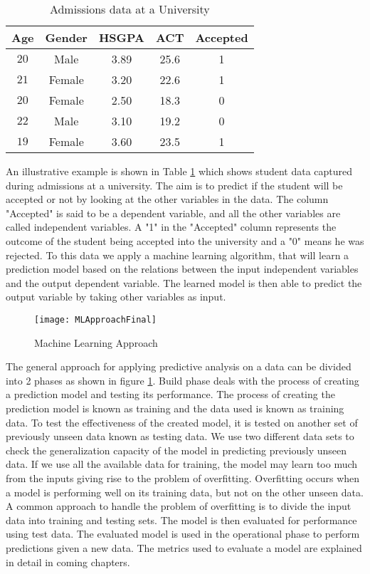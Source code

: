 \documentclass[11pt,openright]{report}
\begin{document}
 \begin{table}[!t]
	\renewcommand{\arraystretch}{1.3}
	\caption{Admissions data at a University}
	\label{table:example_db}
	\centering
	\begin{tabular}{|c|c|c|c|c|}
		\hline
		\bfseries Age & \bfseries Gender & \bfseries HSGPA & \bfseries ACT & \bfseries Accepted\\
		\hline
		$20$ & Male & 3.89 & 25.6 & 1\\ \hline
		$21$ & Female & 3.20 & 22.6 & 1\\ \hline
		$20$ & Female & 2.50 & 18.3 & 0\\ \hline
		$22$ & Male & 3.10 &  19.2 & 0\\ \hline
		$19$ & Female & 3.60 & 23.5 & 1\\ \hline
	\end{tabular}
\end{table}



An illustrative example is shown in Table \ref{table:example_db} which shows student data captured during admissions at a university. The aim is to predict if the student will be accepted or not by looking at the other variables in the data. The column "Accepted" is said to be a dependent variable, and all the other variables are called independent variables. A "1" in the "Accepted" column represents the outcome of the student being accepted into the university and a "0" means he was rejected. To this data we apply a machine learning algorithm, that will learn a prediction model based on the relations between the input independent variables and the output dependent variable. The learned model is then able to predict the output variable by taking other variables as input.
  \begin{figure}
	\centering
	\texttt{[image: MLApproachFinal]}
	\caption{Machine Learning Approach}
	\label{fig:predictive_analysis-approach}
\end{figure}
 

The general approach for applying predictive analysis on a data can be divided into 2 phases as shown in figure \ref{fig:predictive_analysis-approach}. Build phase deals with the process of creating a prediction model and testing its performance. The process of creating the prediction model is known as training and the data used is known as training data. To test the effectiveness of the created model, it is tested on another set of previously unseen data known as testing data. We use two different data sets to check the generalization capacity of the model in predicting previously unseen data. If we use all the available data for training, the model may learn too much from the inputs giving rise to the problem of overfitting. Overfitting occurs when a model is performing well on its training data, but not on the other unseen data. A common approach to handle the problem of overfitting is to divide the input data into training and testing sets. The model is then evaluated for performance using test data.  The evaluated model is used in the operational phase to perform predictions given a new data. The metrics used to evaluate a model are explained in detail in coming chapters.
\end{document}
